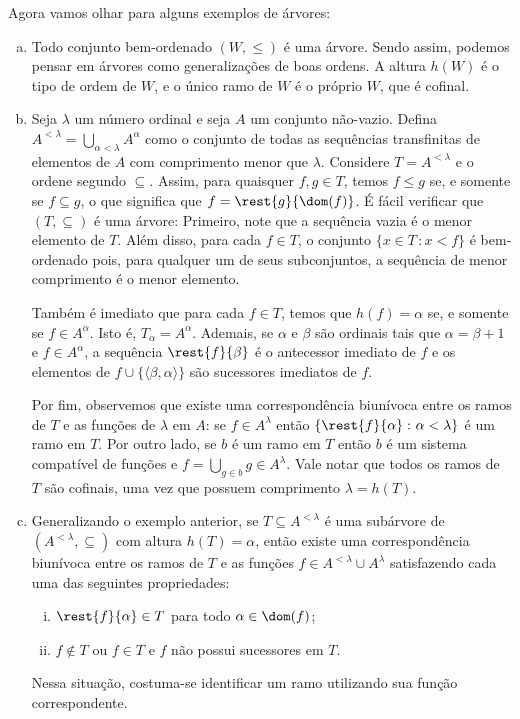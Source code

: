 \documentclass[a4paper]{article}
\theoremstyle{plain}\newtheorem{teo}{Teorema}[section]
\begin{document}
  Agora vamos olhar para alguns exemplos de árvores:
  \begin{exemplo}\hfill
    \begin{enumerate}[(a)]
    \item Todo conjunto bem-ordenado \((W,\leq)\) é uma árvore. Sendo assim,
      podemos pensar em árvores como generalizações de boas ordens. A altura
      \(h(W)\) é o tipo de ordem de \(W\), e o único ramo de \(W\) é o próprio
      \(W\), que é cofinal.
    \item Seja \(\lambda\) um número ordinal e seja \(A\) um conjunto não-vazio.
      Defina \(A^{< \lambda}=\bigcup_{\alpha < \lambda} A^\alpha\) como o
      conjunto de todas as sequências transfinitas de elementos de \(A\) com
      comprimento menor que \(\lambda\). Considere \(T=A^{< \lambda}\) e o
      ordene segundo \(\subseteq\). Assim, para quaisquer \(f,g\in T\),
      temos \(f\leq g\) se, e somente se \(f\subseteq g\), o que significa que
      \(f=\rest{g}{\dom(f)}\). É fácil verificar que \((T,\subseteq)\) é uma árvore:
      Primeiro, note que a sequência vazia é o menor elemento de \(T\). Além
      disso, para cada \(f\in T\), o conjunto \(\{x\in T\,\colon x < f\}\) é
      bem-ordenado pois, para qualquer um de seus subconjuntos, a sequência de
      menor comprimento é o menor elemento.

      Também é imediato que para cada \(f\in T\),
      temos que \(h(f)=\alpha\) se, e somente se \( f\in A^\alpha\). Isto é,
      \(T_\alpha =A^\alpha\). Ademais, se \(\alpha\) e \(\beta\) são ordinais
      tais que \(\alpha =\beta +1\) e \(f\in A^\alpha\), a sequência
      \(\rest{f}{\beta}\) é o antecessor imediato de
      \(f\) e os elementos de \(f\cup \{\langle \beta ,\alpha \rangle\}\) são
      sucessores imediatos de \(f\).

      Por fim, observemos que existe uma  correspondência biunívoca entre os
      ramos de \(T\) e as funções de \(\lambda\) em \(A\):
      se \(f\in A^\lambda\) então \(\{{\rest{f}{\alpha}\,\colon\alpha <\lambda}\}\) é
      um ramo em \(T\). Por outro lado, se \(b\) é um ramo em
      \(T\) então \(b\) é um sistema compatível de funções
      e \(f=\bigcup_{g\in b} g\in A^\lambda\). Vale notar que todos os ramos de \(T\) são
      cofinais, uma vez que possuem comprimento \(\lambda=h(T)\).
      
    \item Generalizando o exemplo anterior, se
      \(T\subseteq A^{<\lambda}\) é uma subárvore de 
      \((A^{<\lambda},\subseteq)\) com altura \(h(T)=\alpha\), então existe uma
      correspondência biunívoca entre os ramos de \(T\) e as funções
      \(f\in A^{<\lambda}\cup A^\lambda\) satisfazendo cada uma das seguintes
      propriedades:
      \begin{enumerate}[(i)]
      \item \(\rest{f}{\alpha}\in T\) para todo \(\alpha \in \dom(f)\);
      \item \(f\not\in T\) ou \(f\in T\) e \(f\) não possui sucessores em \(T\). 
      \end{enumerate}
     Nessa situação, costuma-se identificar um  ramo utilizando sua função correspondente.


\end{enumerate}
\end{exemplo}
\end{document}

